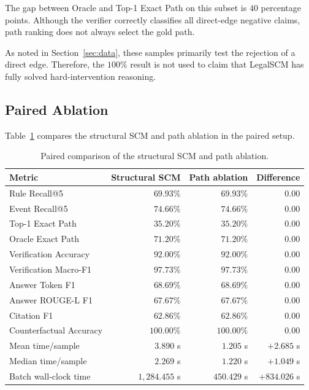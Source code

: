 The gap between Oracle and Top-1 Exact Path on this subset is \(40\)
percentage points. Although the verifier correctly classifies all
direct-edge negative claims, path ranking does not always select the gold
path.

As noted in Section~\ref{sec:data}, these samples primarily test the
rejection of a direct edge. Therefore, the \(100\%\) result is not used to
claim that LegalSCM has fully solved hard-intervention reasoning.

\subsection{Paired Ablation}

Table~\ref{tab:paired-ablation} compares the structural SCM and path ablation
in the paired setup.

\begin{table}[t]
    \centering
    \caption{Paired comparison of the structural SCM and path ablation.}
    \label{tab:paired-ablation}
    \begin{tabular}{lrrr}
        \hline
        \textbf{Metric} &
        \textbf{Structural SCM} &
        \textbf{Path ablation} &
        \textbf{Difference} \\
        \hline
        Rule Recall@5 &
        \(69.93\%\) & \(69.93\%\) & \(0.00\) \\
        Event Recall@5 &
        \(74.66\%\) & \(74.66\%\) & \(0.00\) \\
        Top-1 Exact Path &
        \(35.20\%\) & \(35.20\%\) & \(0.00\) \\
        Oracle Exact Path &
        \(71.20\%\) & \(71.20\%\) & \(0.00\) \\
        Verification Accuracy &
        \(92.00\%\) & \(92.00\%\) & \(0.00\) \\
        Verification Macro-F1 &
        \(97.73\%\) & \(97.73\%\) & \(0.00\) \\
        Answer Token F1 &
        \(68.69\%\) & \(68.69\%\) & \(0.00\) \\
        Answer ROUGE-L F1 &
        \(67.67\%\) & \(67.67\%\) & \(0.00\) \\
        Citation F1 &
        \(62.86\%\) & \(62.86\%\) & \(0.00\) \\
        Counterfactual Accuracy &
        \(100.00\%\) & \(100.00\%\) & \(0.00\) \\
        \hline
        Mean time/sample &
        \(3.890\) s & \(1.205\) s & \(+2.685\) s \\
        Median time/sample &
        \(2.269\) s & \(1.220\) s & \(+1.049\) s \\
        Batch wall-clock time &
        \(1{,}284.455\) s & \(450.429\) s & \(+834.026\) s \\
        \hline
    \end{tabular}
\end{table}

